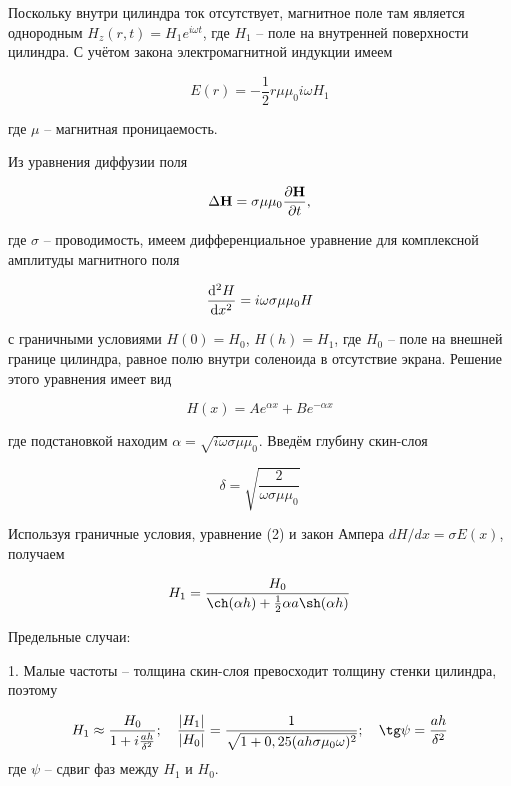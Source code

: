 \documentclass[12pt]{extarticle}
\begin{document}
	Поскольку внутри цилиндра ток отсутствует, магнитное поле там является однородным $H_z(r, t) = H_1 e^{i\omega t}$, где $H_1$ -- поле на внутренней поверхности цилиндра. С учётом закона электромагнитной индукции имеем
	
	\begin{equation}
		E(r) = - \frac{1}{2}r \mu \mu_0 i \omega H_1 
	\end{equation}
	
	где $\mu$ -- магнитная проницаемость.
	
	Из уравнения диффузии поля
	
	\begin{equation}
		\Delta \textbf{H} = \sigma \mu \mu_0 \pdv{\textbf{H}}{t}, 
	\end{equation}
	
	где $\sigma$ -- проводимость, имеем дифференциальное уравнение для комплексной амплитуды магнитного поля
	
	\begin{equation}
		\odv[2]{H}{x}  = i \omega \sigma \mu \mu_0 H 
	\end{equation}
	
	с граничными условиями $H(0) = H_0$, $H(h) = H_1$, где $H_0$ -- поле на внешней границе цилиндра, равное полю внутри соленоида в отсутствие экрана. Решение этого уравнения имеет вид
	
	\begin{equation}
		H(x)  = Ae^{\alpha x} + Be^{-\alpha x} 
	\end{equation}
	
	где подстановкой находим $\alpha = \sqrt{i\omega \sigma \mu \mu_0}$. Введём глубину скин-слоя 
	
	\begin{equation}
		\delta = \sqrt{\frac{2}{\omega \sigma \mu \mu_0}}
	\end{equation}
	
	Используя граничные условия, уравнение (2) и закон Ампера $dH/dx = \sigma E(x)$, получаем
	
	\begin{equation}
		H_1 = \frac{H_0}{\ch(\alpha h) + \frac{1}{2}\alpha a \sh(\alpha h)}
		\label{eq:H1_H0}
	\end{equation}
	
	Предельные случаи:
	
	1. Малые частоты -- толщина скин-слоя превосходит толщину стенки цилиндра, поэтому 
	
	\begin{equation}
		H_1 \approx \frac{H_0}{1 + i \frac{ah}{\delta^2}}; \ \ \ \frac{|H_1|}{|H_0|} = \frac{1}{\sqrt{1 + 0,25(ah\sigma\mu_0\omega)^2}}; \ \ \ \tg \psi = \frac{ah}{\delta^2}
	\end{equation}
	где $\psi$ -- сдвиг фаз между $H_1$ и $H_0$.
	
\end{document}
